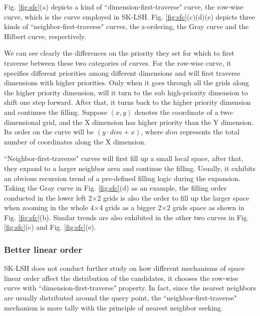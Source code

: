 \documentclass[twocolumn]{svjour3}          %
\begin{document}
Fig. \ref{fig:sfc}(a) depicts a kind of ``dimension-first-traverse" curve, the row-wise curve, which is the curve employed in SK-LSH. Fig. \ref{fig:sfc}(c)(d)(e) depicts three kinds of ``neighbor-first-traverse" curves, the z-ordering, the Gray curve and the Hilbert curve, respectively.

We can see clearly the differences on the priority they set for which to first traverse between these two categories of curves. For the row-wise curve, it specifies different priorities among different dimensions and will first traverse dimensions with higher priorities. Only when it goes through all the grids along the higher priority dimension, will it turn to the sub high-priority dimension to shift one step forward. After that, it turns back to the higher priority dimension and continues the filling. Suppose $(x, y)$ denotes the coordinate of a two-dimensional grid, and the X dimension has higher priority than the Y dimension. Its order on the curve will be $(y \cdot dim + x)$, where $dim$ represents the total number of coordinates along the X dimension.

``Neighbor-first-traverse" curves will first fill up a small local space, after that, they expand to a larger neighbor area and continue the filling. Usually, it exhibits an obvious recursion trend of a pre-defined filling logic during the expansion. Taking the Gray curve in Fig. \ref{fig:sfc}(d) as an example, the filling order conducted in the lower left 2$\times$2 grids is also the order to fill up the larger space when zooming in the whole 4$\times$4 grids as a bigger 2$\times$2 grids space as shown in Fig. \ref{fig:sfc}(b). Similar trends are also exhibited in the other two curves in Fig. \ref{fig:sfc}(c) and Fig. \ref{fig:sfc}(e).

\subsubsection{Better linear order}\label{sssec:anaorder}
SK-LSH does not conduct further study on how different mechanisms of space linear order affect the distribution of the candidates, it chooses the row-wise curve with ``dimension-first-traverse" property.
In fact, since the nearest neighbors are usually distributed around the query point, the ``neighbor-first-traverse" mechanism is more tally with the principle of nearest neighbor seeking.
\end{document}
